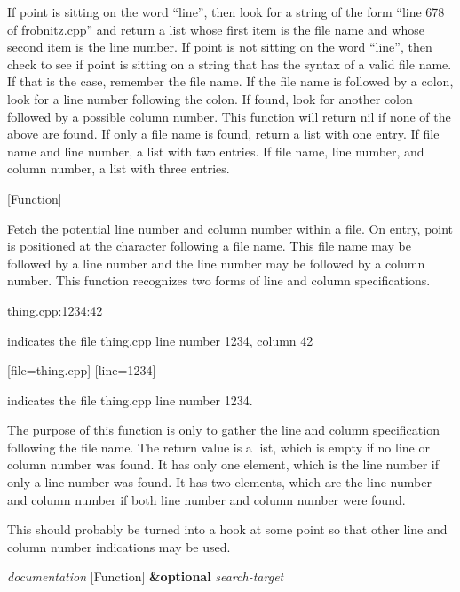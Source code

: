 \begin{doc-string}
If point is sitting on the word ``line'', then look for a string of the form
``line 678 of frobnitz.cpp'' and return a list whose first item is the file name
and whose second item is the line number.  If point is not sitting on the word ``line'',
then check to see if point is sitting on a string that has the syntax of a valid
file name.  If that is the case, remember the file name.  If the file name is
followed by a colon, look for a line number following the colon.  If found, look
for another colon followed by a possible column number.  This function will return
nil if none of the above are found.  If only a file name is found, return a list
with one entry.  If file name and line number, a list with two entries.  If file
name, line number, and column number, a list with three entries.
\end{doc-string}

\vspace{1em}
\noindent
{}
\usebox{\funcname}
 \hfill [Function]

\begin{doc-string}
Fetch the potential line number and column number within a file.  On entry,
point is positioned at the character following a file name.  This file name
may be followed by a line number and the line number may be followed by a
column number.  This function recognizes two forms of line and column
specifications.

  thing.cpp:1234:42

indicates the file thing.cpp line number 1234, column 42

  [file=thing.cpp] [line=1234]

indicates the file thing.cpp line number 1234.

The purpose of this function is only to gather the line and column
specification following the file name.  The return value is a list, which is
empty if no line or column number was found.  It has only one element, which
is the line number if only a line number was found.  It has two elements,
which are the line number and column number if both line number and column
number were found.

This should probably be turned into a hook at some point so that other line
and column number indications may be used.
\end{doc-string}

\vspace{1em}
\noindent
{}
\usebox{\funcname}\emph{documentation}
 \hfill [Function]
\hspace*{\wd\funcname}\textbf{\&optional} \emph{search-target}
\hspace*{\wd\funcname}

